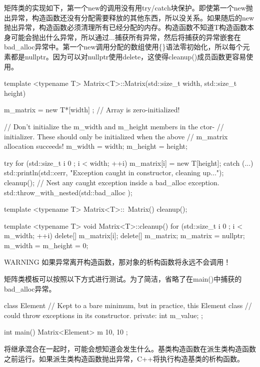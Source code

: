 矩阵类的实现如下，第一个new的调用没有用try/catch块保护。即使第一个new抛出异常，构造函数还没有分配需要释放的其他东西，所以没关系。如果随后的new抛出异常，构造函数必须清理所有已经分配的内存。构造函数不知道T构造函数本身可能会抛出什么异常，所以通过...捕获所有异常，然后将捕获的异常嵌套在bad\_alloc异常中。第一个new调用分配的数组使用\{\}语法零初始化，所以每个元素都是nullptr。因为可以对nullptr使用delete，这使得cleanup()成员函数更容易使用。

\begin{cpp}
template <typename T>
Matrix<T>::Matrix(std::size_t width, std::size_t height)
{
    m_matrix = new T*[width] {}; // Array is zero-initialized!

    // Don't initialize the m_width and m_height members in the ctor-
    // initializer. These should only be initialized when the above
    // m_matrix allocation succeeds!
    m_width = width;
    m_height = height;

    try {
        for (std::size_t i { 0 }; i < width; ++i) {
            m_matrix[i] = new T[height];
        }
    } catch (...) {
        std::println(std::cerr, "Exception caught in constructor, cleaning up...");
        cleanup();
        // Nest any caught exception inside a bad_alloc exception.
        std::throw_with_nested(std::bad_alloc {});
    }
}

template <typename T>
Matrix<T>::~Matrix()
{
    cleanup();
}

template <typename T>
void Matrix<T>::cleanup()
{
    for (std::size_t i { 0 }; i < m_width; ++i) {
        delete[] m_matrix[i];
    }
    delete[] m_matrix;
    m_matrix = nullptr;
    m_width = m_height = 0;
}
\end{cpp}

\begin{myWarning}{WARNING}
如果异常离开构造函数，那对象的析构函数将永远不会调用！
\end{myWarning}

矩阵类模板可以按照以下方式进行测试。为了简洁，省略了在main()中捕获的bad\_alloc异常。

\begin{cpp}
class Element
{
    // Kept to a bare minimum, but in practice, this Element class
    // could throw exceptions in its constructor.
    private:
    int m_value;
};

int main()
{
    Matrix<Element> m { 10, 10 };
}
\end{cpp}

将继承混合在一起时，可能会想知道会发生什么。基类构造函数在派生类构造函数之前运行。如果派生类构造函数抛出异常，C++将执行构造基类的析构函数。

